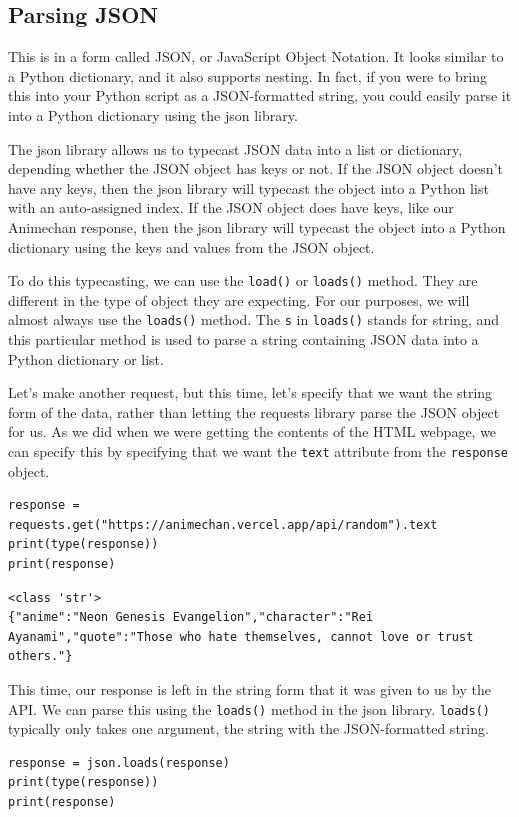 \subsection{Parsing JSON}
This is in a form called JSON, or JavaScript Object Notation. It looks similar to a Python dictionary, and it also supports nesting. In fact, if you were to bring this into your Python script as a JSON-formatted string, you could easily parse it into a Python dictionary using the json library.\par
The json library allows us to typecast JSON data into a list or dictionary, depending whether the JSON object has keys or not. If the JSON object doesn't have any keys, then the json library will typecast the object into a Python list with an auto-assigned index. If the JSON object does have keys, like our Animechan response, then the json library will typecast the object into a Python dictionary using the keys and values from the JSON object.\par
To do this typecasting, we can use the \verb|load()| or \verb|loads()| method. They are different in the type of object they are expecting. For our purposes, we will almost always use the \verb|loads()| method. The \verb|s| in \verb|loads()| stands for string, and this particular method is used to parse a string containing JSON data into a Python dictionary or list.\par
Let's make another request, but this time, let's specify that we want the string form of the data, rather than letting the requests library parse the JSON object for us. As we did when we were getting the contents of the HTML webpage, we can specify this by specifying that we want the \verb|text| attribute from the \verb|response| object.
\begin{lstlisting}[style=pippython]
response = requests.get("https://animechan.vercel.app/api/random").text
print(type(response))
print(response)
\end{lstlisting}
\begin{lstlisting}[style=none]
<class 'str'>
{"anime":"Neon Genesis Evangelion","character":"Rei Ayanami","quote":"Those who hate themselves, cannot love or trust others."}
\end{lstlisting}
This time, our response is left in the string form that it was given to us by the API. We can parse this using the \verb|loads()| method in the json library. \verb|loads()| typically only takes one argument, the string with the JSON-formatted string.
\begin{lstlisting}[style=pippython]
response = json.loads(response)
print(type(response))
print(response)
\end{lstlisting}
